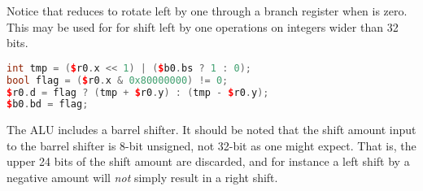 Notice that  reduces to rotate left by one through a branch register
when  is zero. This may be used for for shift left by one
operations on integers wider than 32 bits.

\begin{lstlisting}[numbers=none, basicstyle=\ttfamily\footnotesize, language=C++]
int tmp = ($r0.x << 1) | ($b0.bs ? 1 : 0);
bool flag = ($r0.x & 0x80000000) != 0;
$r0.d = flag ? (tmp + $r0.y) : (tmp - $r0.y);
$b0.bd = flag;
\end{lstlisting}

The \rvex{} ALU includes a barrel shifter. It should be noted that the shift
amount input to the barrel shifter is 8-bit unsigned, not 32-bit as one might
expect. That is, the upper 24 bits of the shift amount are discarded, and for
instance a left shift by a negative amount will \emph{not} simply result in a
right shift.
\vskip 10pt
